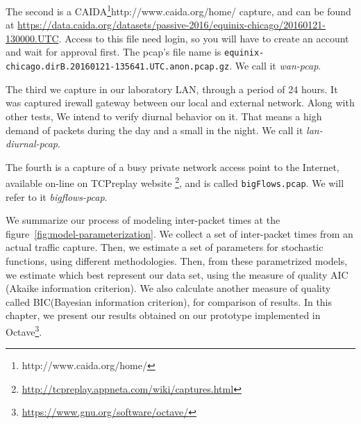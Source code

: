 The second is a CAIDA\footnote{http://www.caida.org/home/}{http://www.caida.org/home/} capture, and can be found at  \href{https://data.caida.org/datasets/passive-2016/equinix-chicago/20160121-130000.UTC}{https://data.caida.org/datasets/passive-2016/equinix-chicago/20160121-130000.UTC}. Access to this file need login, so you will have to create an account and wait for approval first. The pcap's file name is \texttt{equinix-chicago.dirB.20160121-135641.UTC.anon.pcap.gz}. We call it \textit{wan-pcap}.

The third we capture in our laboratory LAN, through a period of 24 hours. It was captured irewall gateway between our local and external network. Along with other tests, We intend to verify diurnal behavior on it. That means a high demand of packets during the day and a small in the night. We call it \textit{lan-diurnal-pcap}.

The fourth is a capture of a busy private network access point to the Internet, available on-line on TCPreplay website \footnote{ \href{http://tcpreplay.appneta.com/wiki/captures.html}{http://tcpreplay.appneta.com/wiki/captures.html}}, and is called \texttt{bigFlows.pcap}. We will refer to it \textit{bigflows-pcap}.






We summarize our process of modeling inter-packet times at the figure~\ref{fig:model-parameterization}. We collect a set of inter-packet times from an actual traffic capture. Then, we estimate a set of parameters for stochastic functions, using different methodologies. Then, from these parametrized models, we estimate which best represent our data set, using the measure of quality AIC (Akaike information criterion). We also calculate another measure of quality called BIC(Bayesian information criterion), for comparison of results. In this chapter, we present our results obtained on our prototype implemented in Octave\footnote{ \href{https://www.gnu.org/software/octave/}{https://www.gnu.org/software/octave/}}. 

